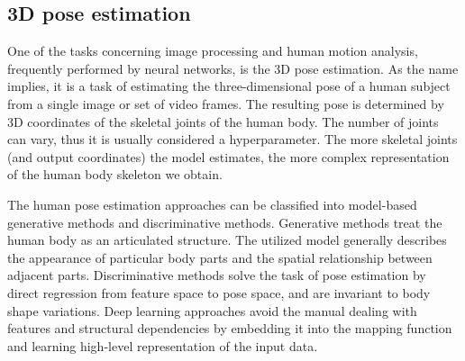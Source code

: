 \subsection{3D pose estimation}
One of the tasks concerning image processing and human motion analysis, frequently performed by neural networks, is the 3D pose estimation. As the name implies, it is a task of estimating the three-dimensional pose of a human subject from a single image or set of video frames. The resulting pose is determined by 3D coordinates of the skeletal joints of the human body. The number of joints can vary, thus it is usually considered a hyperparameter. The more skeletal joints (and output coordinates) the model estimates, the more complex representation of the human body skeleton we obtain.\par
\vspace{5mm}
\noindent
The human pose estimation approaches can be classified into model-based generative methods and discriminative methods. Generative methods treat the human body as an articulated structure. The utilized model generally describes the appearance of particular body parts and the spatial relationship between adjacent parts. Discriminative methods solve the task of pose estimation by direct regression from feature space to pose space, and are invariant to body shape variations. Deep learning approaches avoid the manual dealing with features and structural dependencies by embedding it into the mapping function and learning high-level representation of the input data.\par
\vspace{5mm}
\noindent
